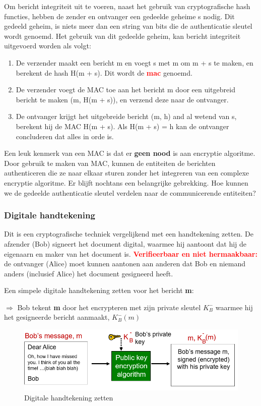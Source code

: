 \noindent Om bericht integriteit uit te voeren, naast het gebruik van cryptografische hash functies, hebben de zender en ontvanger een gedeelde geheime s nodig. Dit gedeeld geheim, is niets meer dan een string van bits die de authenticatie sleutel wordt genoemd. Het gebruik van dit gedeelde geheim, kan bericht integriteit uitgevoerd worden als volgt:
\begin{enumerate}
    \item De verzender maakt een bericht m en voegt s met m om m + s te maken, en berekent de hash H(m + s). Dit wordt de \textcolor{red}{\textbf{\acrfull{mac}}} genoemd.
    \item De verzender voegt de MAC toe aan het bericht m door een uitgebreid bericht te maken (m, H(m + s)), en verzend deze naar de ontvanger.
    \item De ontvanger krijgt het uitgebreide bericht (m, h) and al wetend van s, berekent hij de MAC H(m + s). Als H(m + s) = h kan de ontvanger concluderen dat alles in orde is.
\end{enumerate}
Een leuk kenmerk van een MAC is dat er \textbf{geen nood} is aan encryptie algoritme. Door gebruik te maken van MAC, kunnen de entiteiten de berichten authenticeren die ze naar elkaar sturen zonder het integreren van een complexe encryptie algoritme.
Er blijft nochtans een belangrijke gebrekking. Hoe kunnen we de gedeelde authenticatie sleutel verdelen naar de communicerende entiteiten?

\newpage

\subsubsection{Digitale handtekening}

\noindent Dit is een cryptografische techniek vergelijkend met een handtekening zetten.
\bi
\itf De afzender (Bob) signeert het document digital, waarmee hij aantoont dat hij de eigenaarn en maker van het document is. 
\itf \textcolor{red}{\textbf{Verifieerbaar en niet hermaakbaar:}} de ontvanger (Alice) moet kunnen aantonen aan anderen dat Bob en niemand anders (inclusief Alice) het document gesigneerd heeft.
\ei

\noindent Een simpele digitale handtekening zetten voor het bericht \textbf{m}:

\noindent $\Rightarrow$ Bob tekent \textbf{m} door het encrypteren met zijn private sleutel $K^-_B$ waarmee hij het gesigneerde bericht aanmaakt, $K^-_B (m)$


\begin{figure}[h]
    \centering
    \includegraphics[width=7in]{./img/imghfdst8/hfdst8puntje7.png}
    \caption{Digitale handtekening zetten }      
    \label{fig:Digitale handtekening zetten  }
\end{figure}

